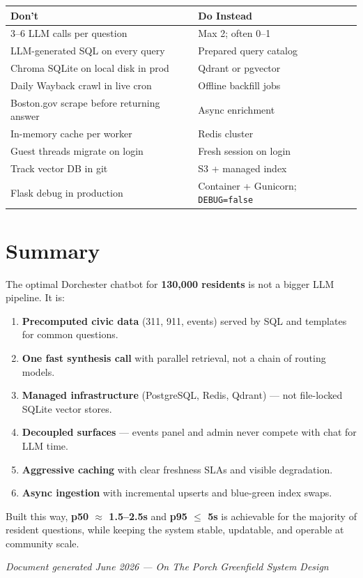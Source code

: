 \documentclass[11pt,a4paper]{article}
\begin{document}
\begin{table}[h]
\centering
\small
\begin{tabular}{@{}ll@{}}
\toprule
\textbf{Don't} & \textbf{Do Instead} \\
\midrule
3--6 LLM calls per question & Max 2; often 0--1 \\
LLM-generated SQL on every query & Prepared query catalog \\
Chroma SQLite on local disk in prod & Qdrant or pgvector \\
Daily Wayback crawl in live cron & Offline backfill jobs \\
Boston.gov scrape before returning answer & Async enrichment \\
In-memory cache per worker & Redis cluster \\
Guest threads migrate on login & Fresh session on login \\
Track vector DB in git & S3 + managed index \\
Flask debug in production & Container + Gunicorn; \texttt{DEBUG=false} \\
\bottomrule
\end{tabular}
\end{table}

\section{Summary}

The optimal Dorchester chatbot for \textbf{130,000 residents} is not a bigger LLM pipeline. It is:

\begin{enumerate}[noitemsep]
  \item \textbf{Precomputed civic data} (311, 911, events) served by SQL and templates for common questions.
  \item \textbf{One fast synthesis call} with parallel retrieval, not a chain of routing models.
  \item \textbf{Managed infrastructure} (PostgreSQL, Redis, Qdrant) --- not file-locked SQLite vector stores.
  \item \textbf{Decoupled surfaces} --- events panel and admin never compete with chat for LLM time.
  \item \textbf{Aggressive caching} with clear freshness SLAs and visible degradation.
  \item \textbf{Async ingestion} with incremental upserts and blue-green index swaps.
\end{enumerate}

Built this way, \textbf{p50 $\approx$ 1.5--2.5s} and \textbf{p95 $\leq$ 5s} is achievable for the majority of resident questions, while keeping the system stable, updatable, and operable at community scale.

\vfill
\begin{center}
\small
\textit{Document generated June 2026 --- On The Porch Greenfield System Design}
\end{center}
\end{document}
